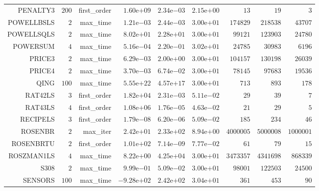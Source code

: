 \begin{longtable}{rrrrrrrrr}
PENALTY3 & \(   200\) & first\_order & \( 1.60\)e\(+09\) & \( 2.34\)e\(-03\) & \( 2.15\)e\(+00\) & \(    13\) & \(    19\) & \(     3\) \\
POWELLBSLS & \(     2\) & max\_time & \( 1.21\)e\(-03\) & \( 2.44\)e\(-03\) & \( 3.00\)e\(+01\) & \(174829\) & \(218538\) & \( 43707\) \\
POWELLSQLS & \(     2\) & max\_time & \( 8.02\)e\(+01\) & \( 2.28\)e\(+01\) & \( 3.00\)e\(+01\) & \( 99121\) & \(123903\) & \( 24780\) \\
POWERSUM & \(     4\) & max\_time & \( 5.16\)e\(-04\) & \( 2.20\)e\(-01\) & \( 3.02\)e\(+01\) & \( 24785\) & \( 30983\) & \(  6196\) \\
PRICE3 & \(     2\) & max\_time & \( 6.29\)e\(-03\) & \( 2.00\)e\(+00\) & \( 3.00\)e\(+01\) & \(104157\) & \(130198\) & \( 26039\) \\
PRICE4 & \(     2\) & max\_time & \( 3.70\)e\(-03\) & \( 6.74\)e\(-02\) & \( 3.00\)e\(+01\) & \( 78145\) & \( 97683\) & \( 19536\) \\
QING & \(   100\) & max\_time & \( 5.55\)e\(+22\) & \( 4.57\)e\(+17\) & \( 3.00\)e\(+01\) & \(   713\) & \(   893\) & \(   178\) \\
RAT42LS & \(     3\) & first\_order & \( 1.82\)e\(+04\) & \( 2.31\)e\(-03\) & \( 5.11\)e\(-02\) & \(    29\) & \(    39\) & \(     7\) \\
RAT43LS & \(     4\) & first\_order & \( 1.08\)e\(+06\) & \( 1.76\)e\(-05\) & \( 4.63\)e\(-02\) & \(    21\) & \(    29\) & \(     5\) \\
RECIPELS & \(     3\) & first\_order & \( 1.79\)e\(-08\) & \( 6.20\)e\(-06\) & \( 5.09\)e\(-02\) & \(   185\) & \(   234\) & \(    46\) \\
ROSENBR & \(     2\) & max\_iter & \( 2.42\)e\(+01\) & \( 2.33\)e\(+02\) & \( 8.94\)e\(+00\) & \(4000005\) & \(5000008\) & \(1000001\) \\
ROSENBRTU & \(     2\) & first\_order & \( 1.01\)e\(+02\) & \( 7.14\)e\(-09\) & \( 7.77\)e\(-02\) & \(    61\) & \(    79\) & \(    15\) \\
ROSZMAN1LS & \(     4\) & max\_time & \( 8.22\)e\(+00\) & \( 4.25\)e\(+04\) & \( 3.00\)e\(+01\) & \(3473357\) & \(4341698\) & \(868339\) \\
S308 & \(     2\) & max\_time & \( 9.99\)e\(-01\) & \( 5.09\)e\(-02\) & \( 3.00\)e\(+01\) & \( 98001\) & \(122503\) & \( 24500\) \\
SENSORS & \(   100\) & max\_time & \(-9.28\)e\(+02\) & \( 2.42\)e\(+02\) & \( 3.04\)e\(+01\) & \(   361\) & \(   453\) & \(    90\) \\

\end{longtable}
